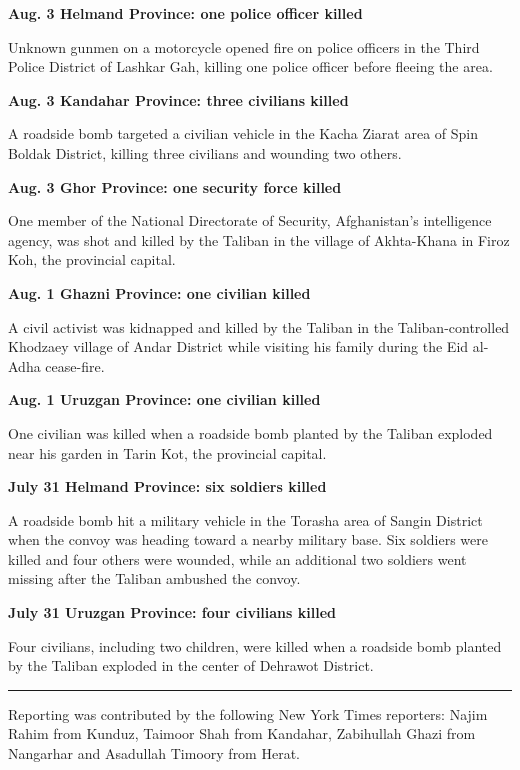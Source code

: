 \textbf{Aug. 3 Helmand Province: one police officer killed}

Unknown gunmen on a motorcycle opened fire on police officers in the
Third Police District of Lashkar Gah, killing one police officer before
fleeing the area.

\textbf{Aug. 3 Kandahar Province: three civilians killed}

A roadside bomb targeted a civilian vehicle in the Kacha Ziarat area of
Spin Boldak District, killing three civilians and wounding two others.

\textbf{Aug. 3 Ghor Province: one security force killed}

One member of the National Directorate of Security, Afghanistan's
intelligence agency, was shot and killed by the Taliban in the village
of Akhta-Khana in Firoz Koh, the provincial capital.

\textbf{Aug. 1 Ghazni Province: one civilian killed}

A civil activist was kidnapped and killed by the Taliban in the
Taliban-controlled Khodzaey village of Andar District while visiting his
family during the Eid al-Adha cease-fire.

\textbf{Aug. 1 Uruzgan Province: one civilian killed}

One civilian was killed when a roadside bomb planted by the Taliban
exploded near his garden in Tarin Kot, the provincial capital.

\textbf{July 31 Helmand Province: six soldiers killed}

A roadside bomb hit a military vehicle in the Torasha area of Sangin
District when the convoy was heading toward a nearby military base. Six
soldiers were killed and four others were wounded, while an additional
two soldiers went missing after the Taliban ambushed the convoy.

\textbf{July 31 Uruzgan Province: four civilians killed}

Four civilians, including two children, were killed when a roadside bomb
planted by the Taliban exploded in the center of Dehrawot District.

\begin{center}\rule{0.5\linewidth}{\linethickness}\end{center}

Reporting was contributed by the following New York Times reporters:
Najim Rahim from Kunduz, Taimoor Shah from Kandahar, Zabihullah Ghazi
from Nangarhar and Asadullah Timoory from Herat.

